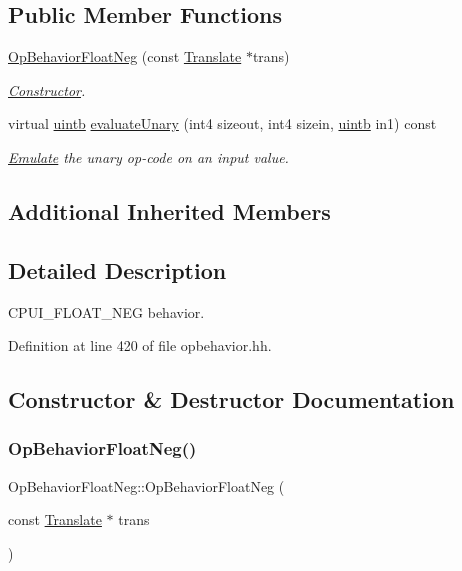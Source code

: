 \subsection*{Public Member Functions}
\begin{DoxyCompactItemize}
\item 
\mbox{\hyperlink{class_op_behavior_float_neg_a0b222467615d183863714cef3ddb90d4}{Op\+Behavior\+Float\+Neg}} (const \mbox{\hyperlink{class_translate}{Translate}} $\ast$trans)
\begin{DoxyCompactList}\small\item\em \mbox{\hyperlink{class_constructor}{Constructor}}. \end{DoxyCompactList}\item 
virtual \mbox{\hyperlink{types_8h_a2db313c5d32a12b01d26ac9b3bca178f}{uintb}} \mbox{\hyperlink{class_op_behavior_float_neg_a19a1bd5158a11dafb319316363cb2564}{evaluate\+Unary}} (int4 sizeout, int4 sizein, \mbox{\hyperlink{types_8h_a2db313c5d32a12b01d26ac9b3bca178f}{uintb}} in1) const
\begin{DoxyCompactList}\small\item\em \mbox{\hyperlink{class_emulate}{Emulate}} the unary op-\/code on an input value. \end{DoxyCompactList}\end{DoxyCompactItemize}
\subsection*{Additional Inherited Members}


\subsection{Detailed Description}
C\+P\+U\+I\+\_\+\+F\+L\+O\+A\+T\+\_\+\+N\+EG behavior. 

Definition at line 420 of file opbehavior.\+hh.



\subsection{Constructor \& Destructor Documentation}
\mbox{\label{class_op_behavior_float_neg_a0b222467615d183863714cef3ddb90d4}} 
\subsubsection{\texorpdfstring{OpBehaviorFloatNeg()}{OpBehaviorFloatNeg()}}
{\footnotesize\ttfamily Op\+Behavior\+Float\+Neg\+::\+Op\+Behavior\+Float\+Neg (\begin{DoxyParamCaption}\item[{const \mbox{\hyperlink{class_translate}{Translate}} $\ast$}]{trans }\end{DoxyParamCaption})\hspace{0.3cm}{\ttfamily [inline]}}



